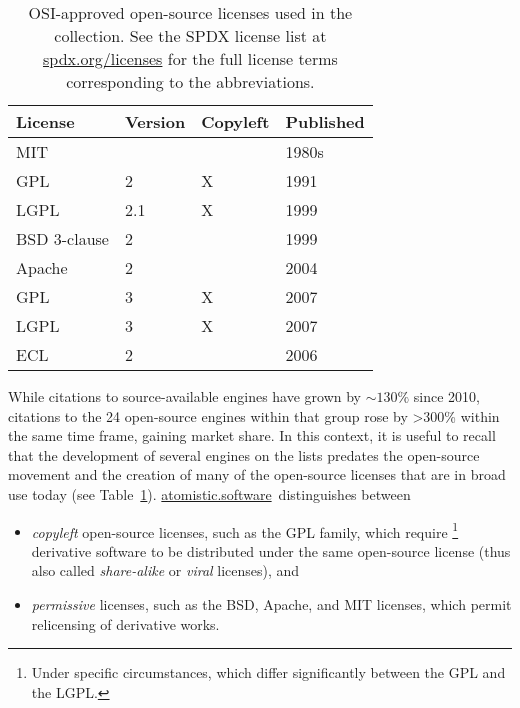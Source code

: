 \documentclass[9pt,review,ASAPversion]{livecoms}
\newcommand{\atsoft}{\href{https://atomistic.software}{atomistic.software}\ }
\begin{document}
\begin{table}
    \centering
    \begin{tabular}{llll} \toprule
        License & Version & Copyleft & Published  \\ \midrule
        MIT &   &   & 1980s\\
        GPL & 2 & X & 1991\\
        LGPL & 2.1 & X & 1999\\
        BSD 3-clause & 2 &   & 1999\\
        Apache & 2 &   & 2004\\
        GPL & 3 & X & 2007\\
        LGPL & 3 & X & 2007\\
        ECL & 2 &   & 2006\\
\bottomrule
    \end{tabular}
    \caption{
        OSI-approved open-source licenses used in the collection.
        See the SPDX license list at \url{spdx.org/licenses} for the full license terms corresponding to the abbreviations.
    }
    \label{tab:open-source-licenses}
\end{table}


While citations to source-available engines have grown by ${\sim}130\%$ since 2010, 
citations to the 24 open-source engines within that group rose by >300\% within the same time frame, gaining market share.
In this context, it is useful to recall that the development of several engines on the lists predates the open-source movement and the creation of many of the open-source licenses that are in broad use today (see Table~\ref{tab:open-source-licenses}).
\atsoft distinguishes between 
\begin{itemize}
    \item 
        \emph{copyleft} open-source licenses, such as the GPL family, which require%
\footnote{Under specific circumstances, which differ significantly between the GPL and the LGPL.}
        derivative software to be distributed under the same open-source license (thus also called \emph{share-alike} or \emph{viral} licenses), and
\item
\emph{permissive} licenses, such as the BSD, Apache, and MIT licenses, which permit relicensing of derivative works.
\end{itemize}
\end{document}
